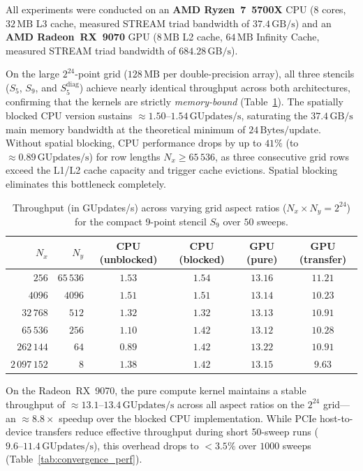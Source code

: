 All experiments were conducted on an \textbf{AMD Ryzen~7~5700X} CPU (8 cores, $32\,\text{MB}$ L3 cache, measured STREAM triad bandwidth of $37.4\,\text{GB/s}$) and an \textbf{AMD Radeon~RX~9070} GPU ($8\,\text{MB}$ L2 cache, $64\,\text{MB}$ Infinity Cache, measured STREAM triad bandwidth of $684.28\,\text{GB/s}$).

On the large $2^{24}$-point grid ($128\,\text{MB}$ per double-precision array), all three stencils ($S_5$, $S_9$, and $S_5^{\text{diag}}$) achieve nearly identical throughput across both architectures, confirming that the kernels are strictly \emph{memory-bound} (Table~\ref{tab:aspect_ratio}). The spatially blocked CPU version sustains $\approx 1.50\text{--}1.54\,\text{GUpdates/s}$, saturating the $37.4\,\text{GB/s}$ main memory bandwidth at the theoretical minimum of $24\,\text{Bytes/update}$. Without spatial blocking, CPU performance drops by up to $41\%$ (to $\approx 0.89\,\text{GUpdates/s}$) for row lengths $N_x \ge 65\,536$, as three consecutive grid rows exceed the L1/L2 cache capacity and trigger cache evictions. Spatial blocking eliminates this bottleneck completely.

\begin{table}[htbp]
    \centering
    \caption{Throughput (in GUpdates/s) across varying grid aspect ratios ($N_x \times N_y = 2^{24}$) for the compact 9-point stencil $S_9$ over $50$ sweeps.}
    \label{tab:aspect_ratio}
    \small
    \begin{tabular}{rrcccc}
        \hline
        \textbf{$N_x$} & \textbf{$N_y$} & \textbf{CPU (unblocked)} & \textbf{CPU (blocked)} & \textbf{GPU (pure)} & \textbf{GPU (transfer)} \\
        \hline
        $256$         & $65\,536$ & $1.53$ & $1.54$ & $13.16$ & $11.21$ \\
        $4096$        & $4096$    & $1.51$ & $1.51$ & $13.14$ & $10.23$ \\
        $32\,768$     & $512$     & $1.32$ & $1.32$ & $13.13$ & $10.91$ \\
        $65\,536$     & $256$     & $1.10$ & $1.42$ & $13.12$ & $10.28$ \\
        $262\,144$    & $64$      & $0.89$ & $1.42$ & $13.22$ & $10.91$ \\
        $2\,097\,152$ & $8$       & $1.38$ & $1.42$ & $13.15$ & $9.63$  \\
        \hline
    \end{tabular}
\end{table}

On the Radeon~RX~9070, the pure compute kernel maintains a stable throughput of $\approx 13.1\text{--}13.4\,\text{GUpdates/s}$ across all aspect ratios on the $2^{24}$ grid---an $\approx 8.8\times$ speedup over the blocked CPU implementation. While PCIe host-to-device transfers reduce effective throughput during short 50-sweep runs ($9.6\text{--}11.4\,\text{GUpdates/s}$), this overhead drops to $< 3.5\%$ over $1000$ sweeps (Table~\ref{tab:convergence_perf}).

